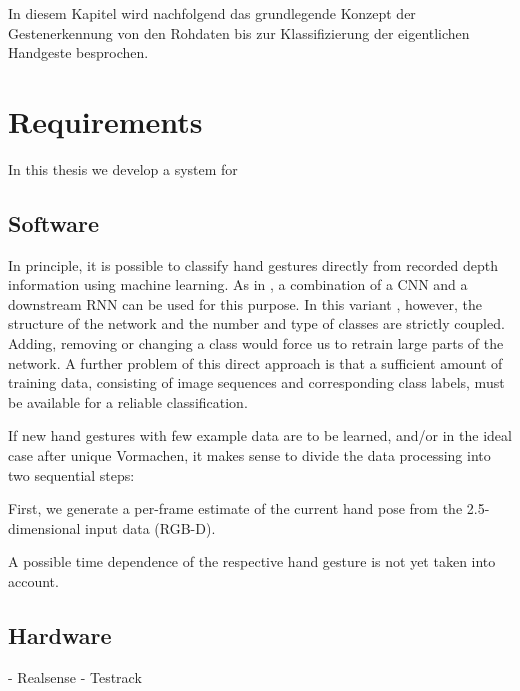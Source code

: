 In diesem Kapitel wird nachfolgend das grundlegende Konzept der Gestenerkennung von den Rohdaten bis zur Klassifizierung der eigentlichen Handgeste besprochen.

\section{Requirements}
In this thesis we develop a system for 
\subsection{Software}
In principle, it is possible to classify hand gestures directly from recorded depth information using machine learning. As in \cite{Molchanov2016}, a combination of a CNN and a downstream RNN can be used for this purpose. In this variant , however, the structure of the network and the number and type of classes are strictly coupled. Adding, removing or changing a class would force us to retrain large parts of the network.
A further problem of this direct approach is that a sufficient amount of training data, consisting of image sequences and corresponding class labels, must be available for a reliable classification.

If new hand gestures with few example data are to be learned, and/or in the ideal case after unique Vormachen, it makes sense to divide the data processing into two sequential steps:

First, we generate a per-frame estimate of the current hand pose from the 2.5-dimensional input data (RGB-D). 


A possible time dependence of the respective hand gesture is not yet taken into account. 




\begin{figure}
	\centering
	
	\caption{}
	\label{fig:software-net-structure-blackbox}
\end{figure}


\subsection{Hardware}
- Realsense
- Testrack